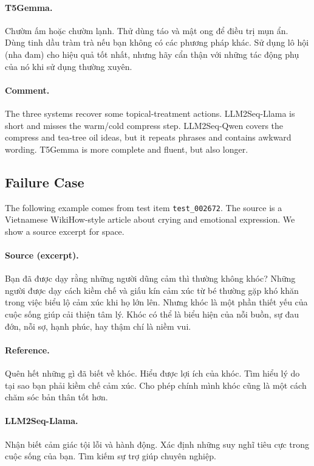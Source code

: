 \documentclass[11pt]{article}
\begin{document}
\paragraph{T5Gemma.}
Chườm ấm hoặc chườm lạnh.
Thử dùng táo và mật ong để điều trị mụn ẩn.
Dùng tinh dầu tràm trà nếu bạn không có các phương pháp khác.
Sử dụng lô hội (nha đam) cho hiệu quả tốt nhất, nhưng hãy cẩn thận với những tác động phụ của nó khi sử dụng thường xuyên.

\paragraph{Comment.}
The three systems recover some topical-treatment actions.
LLM2Seq-Llama is short and misses the warm/cold compress step.
LLM2Seq-Qwen covers the compress and tea-tree oil ideas, but it repeats phrases and contains awkward wording.
T5Gemma is more complete and fluent, but also longer.

\subsection{Failure Case}

The following example comes from test item \texttt{test\_002672}.
The source is a Vietnamese WikiHow-style article about crying and emotional expression.
We show a source excerpt for space.

\paragraph{Source (excerpt).}
Bạn đã được dạy rằng những người dũng cảm thì thường không khóc?
Những người được dạy cách kiềm chế và giấu kín cảm xúc từ bé thường gặp khó khăn trong việc biểu lộ cảm xúc khi họ lớn lên.
Nhưng khóc là một phần thiết yếu của cuộc sống giúp cải thiện tâm lý.
Khóc có thể là biểu hiện của nỗi buồn, sự đau đớn, nỗi sợ, hạnh phúc, hay thậm chí là niềm vui.

\paragraph{Reference.}
Quên hết những gì đã biết về khóc.
Hiểu được lợi ích của khóc.
Tìm hiểu lý do tại sao bạn phải kiềm chế cảm xúc.
Cho phép chính mình khóc cũng là một cách chăm sóc bản thân tốt hơn.

\paragraph{LLM2Seq-Llama.}
Nhận biết cảm giác tội lỗi và hành động.
Xác định những suy nghĩ tiêu cực trong cuộc sống của bạn.
Tìm kiếm sự trợ giúp chuyên nghiệp.
\end{document}
